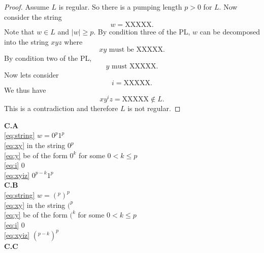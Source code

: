 \documentclass[10pt]{article}
\begin{document}
\begin{proof}
    Assume $L$ is regular. So there is a pumping length $p > 0$ for $L.$ Now consider the string
    \begin{equation}\label{eq:string}
        w= \text{XXXXX}.
    \end{equation}
    Note that $w\in L$ and $|w|\ge p.$ By condition three of the PL, $w$ can be decomposed into the string $xyz$ where
    \begin{equation} \label{eq:xy}
        xy \text{ must be XXXXX.}
    \end{equation}
    By condition two of the PL,
    \begin{equation} \label{eq:y}
        y \text{ must XXXXX.}
    \end{equation}
    Now lets consider
    \begin{equation} \label{eq:i}
        i =\text{XXXXX.}
    \end{equation}
    We thus have
    \begin{equation} \label{eq:xyiz}
        xy^iz=\text{XXXXX}\notin L.
    \end{equation}
    This is a contradiction and therefore $L$ is not regular.
\end{proof}


\noindent
\textbf{C.A}\\


\noindent
\eqref{eq:string} $w=0^p1^p$\\
\eqref{eq:xy} in the string $0^p$\\
\eqref{eq:y} be of the form $0^k$ for some $0<k\le p$\\
\eqref{eq:i} $0$\\
\eqref{eq:xyiz} $0^{p-k}1^p$\\

\noindent
\textbf{C.B}\\

\noindent
\eqref{eq:string} $w=(^p)^p$\\
\eqref{eq:xy} in the string $(^p$\\
\eqref{eq:y} be of the form $(^k$ for some $0<k\le p$\\
\eqref{eq:i} $0$\\
\eqref{eq:xyiz} $(^{p-k})^p$\\

\noindent
\textbf{C.C}\\
\end{document}
